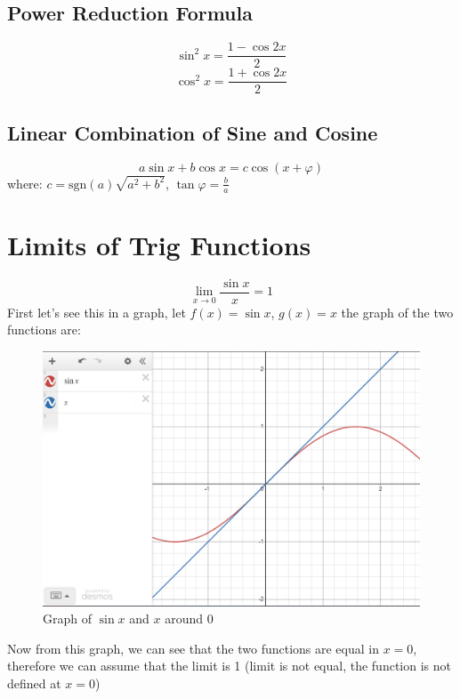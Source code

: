 \documentclass{article}
\begin{document}
\subsection{Power Reduction Formula}
\begin{equation}
    \sin^2x = \frac{1 - \cos 2x}{2}
\end{equation}
\begin{equation}
    \cos^2x = \frac{1 + \cos 2x}{2}
\end{equation}

\subsection{Linear Combination of Sine and Cosine}
\begin{equation}
    a\sin x + b\cos x = c\cos (x + \varphi)
\end{equation}
where: $c = \text{sgn}(a)\sqrt{a^2+b^2}$, $\tan \varphi = \frac{b}{a}$

\newpage
\section{Limits of Trig Functions}
\[
    \lim_{x\to 0} \frac{\sin x }{x} = 1
\]
First let's see this in a graph, let $f(x) = \sin x$, $g(x) = x$ the graph of the two functions are:
\begin{figure}[H]
    \centering
    \includegraphics[width = 12cm]{pictures/triglimit1.png}
    \caption{Graph of $\sin x$ and $x$ around 0}
\end{figure}
Now from this graph, we can see that the two functions are equal in $x=0$, therefore we can assume that the limit is 1 (limit is not equal, the function is not defined at $x=0$)
\end{document}
